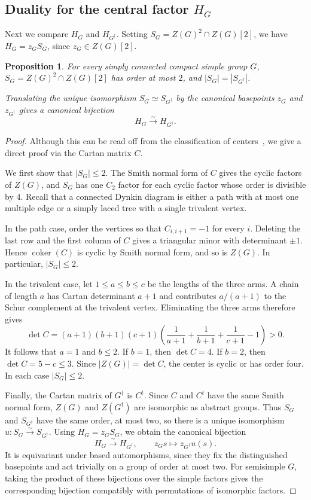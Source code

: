 \documentclass[11pt,a4paper,reqno]{amsart}
\theoremstyle{plain}
\newtheorem{proposition}[theorem]{Proposition}
\theoremstyle{definition}
\theoremstyle{remark}
\numberwithin{equation}{section}
\DeclareMathOperator{\coker}{coker}
\begin{document}
\subsection{Duality for the central factor \texorpdfstring{$H_G$}{HG}}

Next we compare $H_G$ and $H_{G^\dagger}$. Setting $S_G=Z(G)^2\cap Z(G)[2]$, we have $H_G=z_GS_G$, since $z_G\in Z(G)[2]$.

\begin{proposition}\label{prop:icosahedral-center}
For every simply connected compact simple group $G$, $S_G=Z(G)^2\cap Z(G)[2]$ has order at most $2$, and $|S_G|=|S_{G^\dagger}|$.

Translating the unique isomorphism $S_G\simeq S_{G^\dagger}$ by the canonical basepoints $z_G$ and $z_{G^\dagger}$ gives a canonical bijection
\[
H_G\xrightarrow{\sim}H_{G^\dagger}.
\]
\end{proposition}

\begin{proof}
Although this can be read off from the classification of centers~\cite[Ch.~24, \S c]{MilneAG2017}, we give a direct proof via the Cartan matrix $C$.

We first show that $|S_G|\le2$. The Smith normal form of $C$ gives the cyclic factors of $Z(G)$, and $S_G$ has one $C_2$ factor for each cyclic factor whose order is divisible by $4$. Recall that a connected Dynkin diagram is either a path with at most one multiple edge or a simply laced tree with a single trivalent vertex.

In the path case, order the vertices so that $C_{i,i+1}=-1$ for every $i$. Deleting the last row and the first column of $C$ gives a triangular minor with determinant $\pm1$. Hence $\coker(C)$ is cyclic by Smith normal form, and so is $Z(G)$. In particular, $|S_G|\le2$.

In the trivalent case, let $1\le a\le b\le c$ be the lengths of the three arms. A chain of length $a$ has Cartan determinant $a+1$ and contributes $a/(a+1)$ to the Schur complement at the trivalent vertex. Eliminating the three arms therefore gives
\[
\det C=(a+1)(b+1)(c+1)\left(\frac{1}{a+1}+\frac{1}{b+1}+\frac{1}{c+1}-1\right)>0.
\]
It follows that $a=1$ and $b\le2$. If $b=1$, then $\det C=4$. If $b=2$, then $\det C=5-c\le3$. Since $|Z(G)|=\det C$, the center is cyclic or has order four. In each case $|S_G|\le2$.

Finally, the Cartan matrix of $G^\dagger$ is $C^t$. Since $C$ and $C^t$ have the same Smith normal form, $Z(G)$ and $Z(G^\dagger)$ are isomorphic as abstract groups. Thus $S_G$ and $S_{G^\dagger}$ have the same order, at most two, so there is a unique isomorphism $u\colon S_G\xrightarrow{\sim}S_{G^\dagger}$. Using $H_G=z_GS_G$, we obtain the canonical bijection
\[
H_G\xrightarrow{\sim}H_{G^\dagger},\qquad z_Gs\longmapsto z_{G^\dagger}u(s).
\]
It is equivariant under based automorphisms, since they fix the distinguished basepoints and act trivially on a group of order at most two. For semisimple $G$, taking the product of these bijections over the simple factors gives the corresponding bijection compatibly with permutations of isomorphic factors.
\end{proof}
\end{document}
